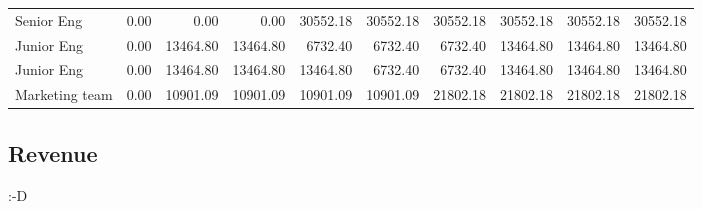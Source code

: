 \begin{table}[h]
\begin{tabular}{lrrrrrrrrr}
Senior Eng                       & 0.00     & 0.00     & 0.00     & 30552.18 & 30552.18 & 30552.18 & 30552.18 & 30552.18 & 30552.18\\
Junior Eng                       & 0.00     & 13464.80 & 13464.80 & 6732.40  & 6732.40  & 6732.40  & 13464.80 & 13464.80 & 13464.80\\
Junior Eng                       & 0.00     & 13464.80 & 13464.80 & 13464.80 & 6732.40  & 6732.40  & 13464.80 & 13464.80 & 13464.80\\
Marketing team             & 0.00     & 10901.09 & 10901.09 & 10901.09 & 10901.09 & 21802.18 & 21802.18 & 21802.18 & 21802.18\\
\bottomrule
\end{tabular}
\end{table}

\subsection{Revenue}

:-D
